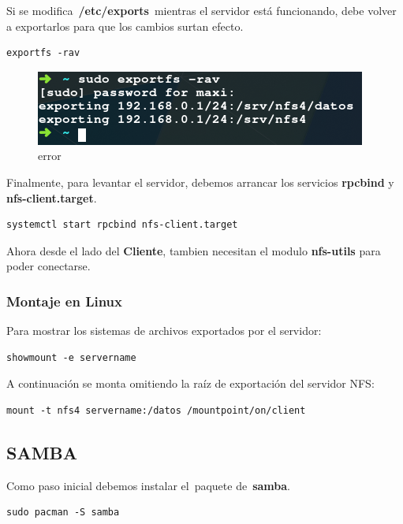 \documentclass[12pt]{extarticle}
\makeatletter
\def\maxwidth{\ifdim\Gin@nat@width>\linewidth\linewidth
    \else\Gin@nat@width\fi}
\let\Oldincludegraphics\includegraphics
\renewcommand{\includegraphics}[1]{\Oldincludegraphics[width=.8\maxwidth]{#1}}
\makeatother
\begin{document}
Si se modifica~\textbf{/etc/exports}~mientras el servidor está
funcionando, debe volver a exportarlos para que los cambios surtan
efecto.

\begin{verbatim}
exportfs -rav
\end{verbatim}

\begin{figure}
\centering
\includegraphics{images/exportfs.png}
\caption{error}
\end{figure}

Finalmente, para levantar el servidor, debemos arrancar los servicios
\textbf{rpcbind} y \textbf{nfs-client.target}.

\begin{verbatim}
systemctl start rpcbind nfs-client.target
\end{verbatim}

Ahora desde el lado del \textbf{Cliente}, tambien necesitan el modulo
\textbf{nfs-utils} para poder conectarse.

\subsubsection{Montaje en Linux}\label{montaje-en-linux}

Para mostrar los sistemas de archivos exportados por el servidor:

\begin{verbatim}
showmount -e servername
\end{verbatim}

A continuación se monta omitiendo la raíz de exportación del servidor
NFS:

\begin{verbatim}
mount -t nfs4 servername:/datos /mountpoint/on/client
\end{verbatim}

\subsection{SAMBA}\label{samba}

Como paso inicial debemos instalar el~paquete de~\textbf{samba}.

\begin{verbatim}
sudo pacman -S samba
\end{verbatim}
\end{document}
